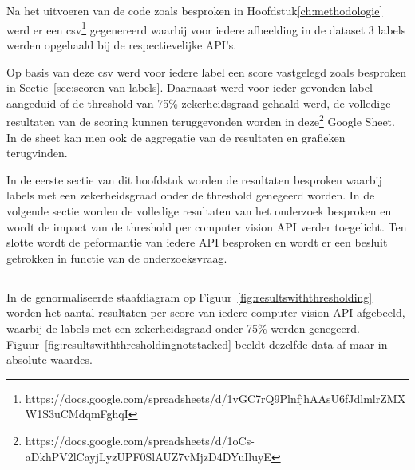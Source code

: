 
\chapter{}
\label{ch:resultaten}

\section{}
\label{sec:resultaten-inleiding}
Na het uitvoeren van de code zoals besproken in Hoofdstuk\ref{ch:methodologie} werd er een csv\footnote{https://docs.google.com/spreadsheets/d/1vGC7rQ9PlnfjhAAsU6fJdlmlrZMXW1S3uCMdqmFghqI} gegenereerd waarbij voor iedere afbeelding in de dataset 3 labels werden opgehaald bij de respectievelijke API's.

Op basis van deze csv werd voor iedere label een score vastgelegd zoals besproken in Sectie~\ref{sec:scoren-van-labels}. Daarnaast werd voor ieder gevonden label aangeduid of de threshold van 75\% zekerheidsgraad gehaald werd, de volledige resultaten van de scoring kunnen teruggevonden worden in deze\footnote{https://docs.google.com/spreadsheets/d/1oCs-aDkhPV2lCayjLyzUPF0SlAUZ7vMjzD4DYuIluyE} Google Sheet. In de sheet kan men ook de aggregatie van de resultaten en grafieken terugvinden.

In de eerste sectie van dit hoofdstuk worden de resultaten besproken waarbij labels met een zekerheidsgraad onder de threshold genegeerd worden. In de volgende sectie worden de volledige resultaten van het onderzoek besproken en wordt de impact van de threshold per computer vision API verder toegelicht. Ten slotte wordt de peformantie van iedere API besproken en wordt er een besluit getrokken in functie van de onderzoeksvraag.

\section{}
\label{sec:resultaten-met-thresholding}
In de genormaliseerde staafdiagram op Figuur~\ref{fig:resultswiththresholding} worden het aantal resultaten per score van iedere computer vision API afgebeeld, waarbij de labels met een zekerheidsgraad onder 75\% werden genegeerd. Figuur~\ref{fig:resultswiththresholdingnotstacked} beeldt dezelfde data af maar in absolute waardes.

